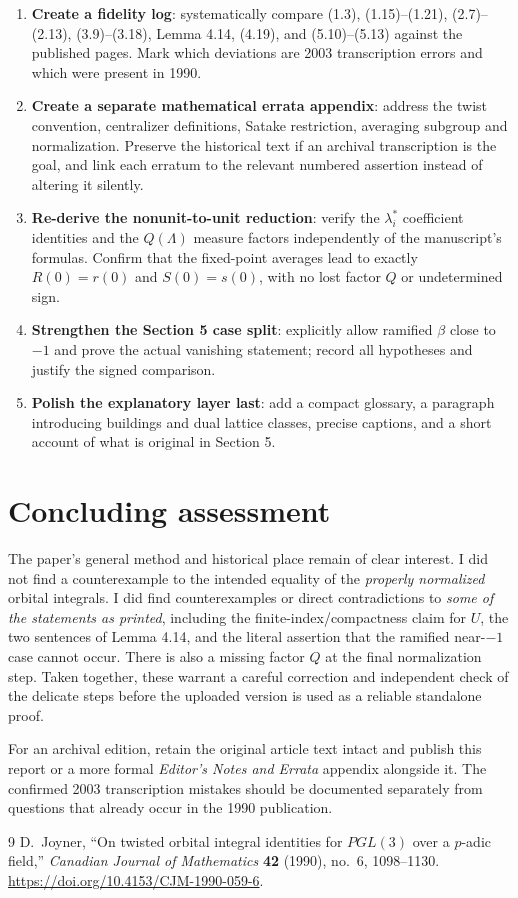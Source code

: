 \documentclass[12pt,letterpaper]{article}
\begin{document}
\begin{enumerate}[label=\textbf{Step \arabic*.},leftmargin=*]
\item \textbf{Create a fidelity log}: systematically compare
(1.3), (1.15)--(1.21), (2.7)--(2.13), (3.9)--(3.18), Lemma 4.14,
(4.19), and (5.10)--(5.13) against the published pages.
Mark which deviations are 2003 transcription errors and which were
present in 1990.
\item \textbf{Create a separate mathematical errata appendix}: address
the twist convention, centralizer definitions, Satake restriction,
averaging subgroup and normalization. Preserve the historical text if
an archival transcription is the goal, and link each erratum to the
relevant numbered assertion instead of altering it silently.
\item \textbf{Re-derive the nonunit-to-unit reduction}: verify the
$\lambda_i^*$ coefficient identities and the $Q(\Lambda)$ measure
factors independently of the manuscript's formulas. Confirm that the
fixed-point averages lead to exactly $R(0)=r(0)$ and $S(0)=s(0)$,
with no lost factor $Q$ or undetermined sign.
\item \textbf{Strengthen the Section 5 case split}: explicitly allow
ramified $\beta$ close to $-1$ and prove the actual vanishing statement;
record all hypotheses and justify the signed comparison.
\item \textbf{Polish the explanatory layer last}: add a compact glossary,
a paragraph introducing buildings and dual lattice classes, precise
captions, and a short account of what is original in Section 5.
\end{enumerate}

\section{Concluding assessment}

The paper's general method and historical place remain of clear
interest. I did not find a counterexample to the intended equality of
the \emph{properly normalized} orbital integrals. I did find
counterexamples or direct contradictions to \emph{some of the statements
as printed}, including the finite-index/compactness claim for $U$,
the two sentences of Lemma 4.14, and the literal assertion that the
ramified near-$-1$ case cannot occur. There is also a missing factor
$Q$ at the final normalization step. Taken together, these warrant a
careful correction and independent check of the delicate steps before
the uploaded version is used as a reliable standalone proof.

For an archival edition, retain the original article text intact and
publish this report or a more formal \emph{Editor's Notes and Errata}
appendix alongside it. The confirmed 2003 transcription mistakes should
be documented separately from questions that already occur in the 1990
publication.

\begin{thebibliography}{9}
D.~Joyner, ``On twisted orbital integral identities for $PGL(3)$ over a
$p$-adic field,'' \emph{Canadian Journal of Mathematics}
\textbf{42} (1990), no.~6, 1098--1130.
\url{https://doi.org/10.4153/CJM-1990-059-6}.
\end{thebibliography}
\end{document}
